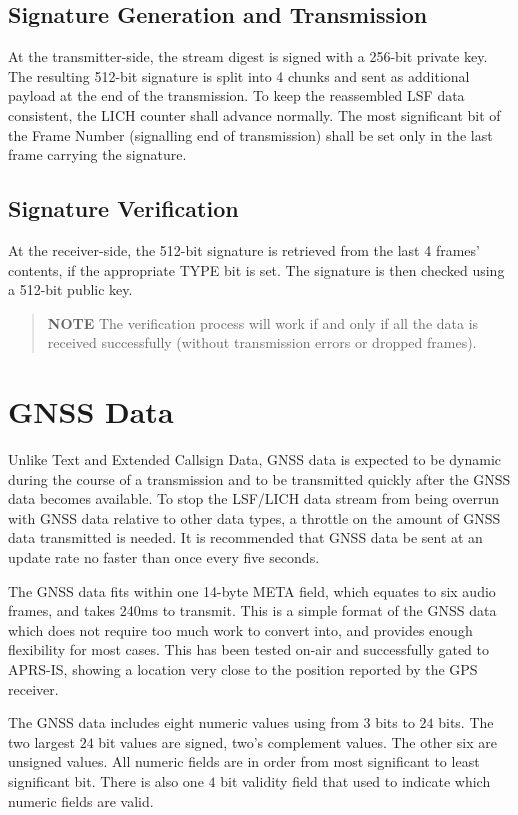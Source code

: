 \documentclass[a4paper,11pt,oneside]{book}
\begin{document}
\section{Signature Generation and Transmission}
At the transmitter-side, the stream digest is signed with a 256-bit private key. The resulting 512-bit signature is split into 4 chunks and sent as additional payload at the end of the transmission. To keep the reassembled LSF data consistent, the LICH counter shall advance normally. The most significant bit of the Frame Number (signalling end of transmission) shall be set only in the last frame carrying the signature.

\section{Signature Verification}
At the receiver-side, the 512-bit signature is retrieved from the last 4 frames' contents, if the appropriate TYPE bit is set. The signature is then checked using a 512-bit public key.
\begin{quote}
	\textbf{NOTE} The verification process will work if and only if all the data is received successfully (without transmission errors or dropped frames).
\end{quote}

\chapter{GNSS Data} \label{gnss_data}

Unlike Text and Extended Callsign Data, GNSS data is expected to be dynamic during the course of a transmission and to be transmitted quickly after the GNSS data becomes available. To stop the LSF/LICH data stream from being overrun with GNSS data relative to other data types, a throttle on the amount of GNSS data transmitted is needed. It is recommended that GNSS data be sent at an update rate no faster than once every five seconds.

The GNSS data fits within one 14-byte META field, which equates to six audio frames, and takes 240ms to transmit. This is a simple format of the GNSS data which does not require too much work to convert into, and provides enough flexibility for most cases. This has been tested on-air and successfully gated to APRS-IS, showing a location very close to the position reported by the GPS receiver.

The GNSS data includes eight numeric values using from $3$ bits to $24$ bits. The two largest $24$ bit values are signed, two's complement values. The other six are unsigned values. All numeric fields are in order from most significant to least significant bit. There is also one $4$ bit validity field that used to indicate which numeric fields are valid.
\end{document}
